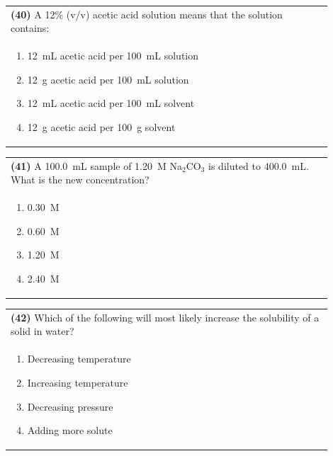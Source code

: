 \documentclass{article}
\begin{document}
\noindent\begin{tabular}{|p{0.9\linewidth}|}
\hline
\textbf{(40)} A 12\% (v/v) acetic acid solution means that the solution contains:\\[0.2cm]
\begin{minipage}[t]{0.85\linewidth}
\begin{enumerate}[label=\alph*.]
\item 12~mL acetic acid per 100~mL solution
\item 12~g acetic acid per 100~mL solution
\item 12~mL acetic acid per 100~mL solvent
\item 12~g acetic acid per 100~g solvent
\end{enumerate}
\end{minipage}\\[0.2cm]
\hline
\end{tabular}
\newpage

\noindent\begin{tabular}{|p{0.9\linewidth}|}
\hline
\textbf{(41)} A 100.0~mL sample of 1.20~M Na$_2$CO$_3$ is diluted to 400.0~mL. What is the new concentration?\\[0.2cm]
\begin{minipage}[t]{0.85\linewidth}
\begin{enumerate}[label=\alph*.]
\item 0.30~M
\item 0.60~M
\item 1.20~M
\item 2.40~M
\end{enumerate}
\end{minipage}\\[0.2cm]
\hline
\end{tabular}

\noindent\begin{tabular}{|p{0.9\linewidth}|}
\hline
\textbf{(42)} Which of the following will most likely increase the solubility of a solid in water?\\[0.2cm]
\begin{minipage}[t]{0.85\linewidth}
\begin{enumerate}[label=\alph*.]
\item Decreasing temperature
\item Increasing temperature
\item Decreasing pressure
\item Adding more solute
\end{enumerate}
\end{minipage}\\[0.2cm]
\hline
\end{tabular}
\end{document}
